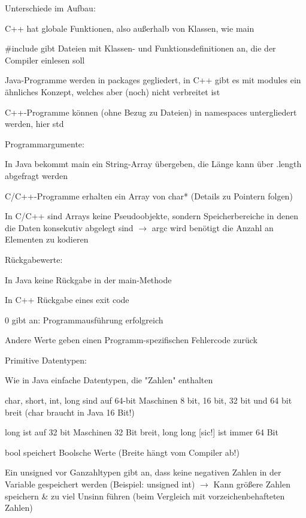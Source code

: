 \documentclass[10pt]{article}
\begin{document}
\begin{itemize*}
  \item Unterschiede im Aufbau:
  \begin{itemize*}
    \item C++ hat globale Funktionen, also außerhalb von Klassen, wie main
    \item \#include gibt Dateien mit Klassen- und Funktionsdefinitionen an, die der Compiler einlesen soll
    \item Java-Programme werden in packages gegliedert, in C++ gibt es mit modules ein ähnliches Konzept, welches aber (noch) nicht verbreitet ist
    \item C++-Programme können (ohne Bezug zu Dateien) in namespaces untergliedert werden, hier std
  \end{itemize*}
  \item Programmargumente:
  \begin{itemize*}
    \item In Java bekommt main ein String-Array übergeben, die Länge kann über .length abgefragt werden
    \item C/C++-Programme erhalten ein Array von char* (Details zu Pointern folgen)
    \item In C/C++ sind Arrays keine Pseudoobjekte, sondern Speicherbereiche in denen die Daten konsekutiv abgelegt sind $\rightarrow$ argc wird benötigt die Anzahl an Elementen zu kodieren
  \end{itemize*}
  \item Rückgabewerte:
  \begin{itemize*}
    \item In Java keine Rückgabe in der main-Methode
    \item In C++ Rückgabe eines exit code
    \begin{itemize*}
      \item 0 gibt an: Programmausführung erfolgreich
      \item Andere Werte geben einen Programm-spezifischen Fehlercode zurück
    \end{itemize*}
  \end{itemize*}
  \item Primitive Datentypen:
  \begin{itemize*}
    \item Wie in Java einfache Datentypen, die "Zahlen" enthalten
    \item char, short, int, long sind auf 64-bit Maschinen 8 bit, 16 bit, 32 bit und 64 bit breit (char braucht in Java 16 Bit!)
    \item long ist auf 32 bit Maschinen 32 Bit breit, long long [sic!] ist immer 64 Bit
    \item bool speichert Boolsche Werte (Breite hängt vom Compiler ab!)
    \item Ein unsigned vor Ganzahltypen gibt an, dass keine negativen Zahlen in der Variable gespeichert werden (Beispiel: unsigned int) $\rightarrow$ Kann größere Zahlen speichern \& zu viel Unsinn führen (beim Vergleich mit vorzeichenbehafteten Zahlen)
  \end{itemize*}
\end{itemize*}
\end{document}
